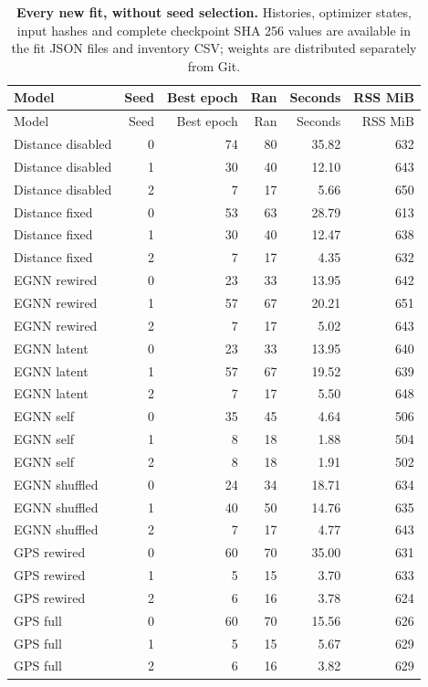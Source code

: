 \begin{longtable}{@{}lrrrrr@{}}\caption{\textbf{Every new fit, without seed selection.} Histories, optimizer states, input hashes and complete checkpoint SHA 256 values are available in the fit JSON files and inventory CSV; weights are distributed separately from Git.}\label{tab:extension_fits}\\\toprule Model & Seed & Best epoch & Ran & Seconds & RSS MiB \\\midrule\endfirsthead\toprule Model & Seed & Best epoch & Ran & Seconds & RSS MiB \\\midrule\endhead
Distance disabled & 0 & 74 & 80 & 35.82 & 632 \\
Distance disabled & 1 & 30 & 40 & 12.10 & 643 \\
Distance disabled & 2 & 7 & 17 & 5.66 & 650 \\
Distance fixed & 0 & 53 & 63 & 28.79 & 613 \\
Distance fixed & 1 & 30 & 40 & 12.47 & 638 \\
Distance fixed & 2 & 7 & 17 & 4.35 & 632 \\
EGNN rewired & 0 & 23 & 33 & 13.95 & 642 \\
EGNN rewired & 1 & 57 & 67 & 20.21 & 651 \\
EGNN rewired & 2 & 7 & 17 & 5.02 & 643 \\
EGNN latent & 0 & 23 & 33 & 13.95 & 640 \\
EGNN latent & 1 & 57 & 67 & 19.52 & 639 \\
EGNN latent & 2 & 7 & 17 & 5.50 & 648 \\
EGNN self & 0 & 35 & 45 & 4.64 & 506 \\
EGNN self & 1 & 8 & 18 & 1.88 & 504 \\
EGNN self & 2 & 8 & 18 & 1.91 & 502 \\
EGNN shuffled & 0 & 24 & 34 & 18.71 & 634 \\
EGNN shuffled & 1 & 40 & 50 & 14.76 & 635 \\
EGNN shuffled & 2 & 7 & 17 & 4.77 & 643 \\
GPS rewired & 0 & 60 & 70 & 35.00 & 631 \\
GPS rewired & 1 & 5 & 15 & 3.70 & 633 \\
GPS rewired & 2 & 6 & 16 & 3.78 & 624 \\
GPS full & 0 & 60 & 70 & 15.56 & 626 \\
GPS full & 1 & 5 & 15 & 5.67 & 629 \\
GPS full & 2 & 6 & 16 & 3.82 & 629 \\

\end{longtable}
